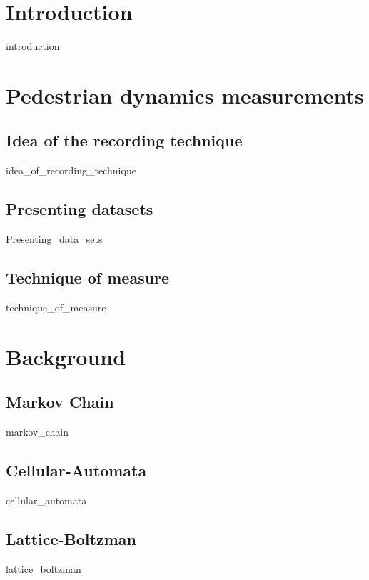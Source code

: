 \documentclass[10pt,a4paper]{report}
\begin{document}

\tableofcontents



\chapter{Introduction}

{introduction}


\chapter{Pedestrian dynamics measurements}

\section{Idea of the recording technique}
{idea_of_recording_technique}

\section{Presenting datasets}
{Presenting_data_sets}

\section{Technique of measure}
{technique_of_measure}



\chapter{Background}

\section{Markov Chain}
{markov_chain}

\section{Cellular-Automata}
{cellular_automata}

\section{Lattice-Boltzman}
{lattice_boltzman}
\end{document}
